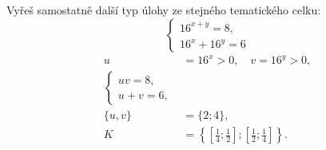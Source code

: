 \documentclass[11pt,a4paper]{article}
\begin{document}
\begin{zadaniReseniBox}[title={Samostatná práce 2}]
Vyřeš samostatně další typ úlohy ze stejného tematického celku:
\[
\displaystyle\begin{cases}16^{x+y}=8,\\16^x+16^y=6\end{cases}
\]
\tcblower
\[\begin{aligned}u&=16^x>0,\quad v=16^y>0,\\\begin{cases}uv=8,\\u+v=6,\end{cases}\\\{u,v\}&=\{2;4\},\\K&=\left\{\left[\frac{1}{4};\frac{1}{2}\right];\left[\frac{1}{2};\frac{1}{4}\right]\right\}.\end{aligned}\]
\end{zadaniReseniBox}
\end{document}
